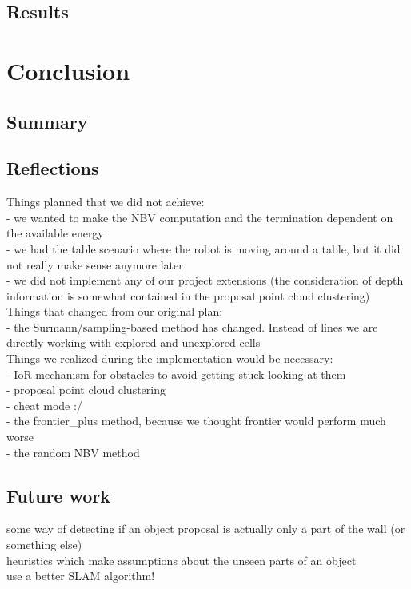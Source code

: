\documentclass[a4paper,11pt,english]{article}
\begin{document}
\subsection{Results}

\section{Conclusion}
\label{Conclusion}

\subsection{Summary}
\subsection{Reflections}

Things planned that we did not achieve:\\
- we wanted to make the NBV computation and the termination dependent on the available energy\\
- we had the table scenario where the robot is moving around a table, but it did not really make sense anymore later\\
- we did not implement any of our project extensions (the consideration of depth information is somewhat contained in the proposal point cloud clustering)\\

Things that changed from our original plan:\\
- the Surmann/sampling-based method has changed. Instead of lines we are directly working with explored and unexplored cells\\

Things we realized during the implementation would be necessary:\\
- IoR mechanism for obstacles to avoid getting stuck looking at them\\
- proposal point cloud clustering\\
- cheat mode :/\\
- the frontier\_plus method, because we thought frontier would perform much worse\\
- the random NBV method

\subsection{Future work}
some way of detecting if an object proposal is actually only a part of the wall (or something else)\\
heuristics which make assumptions about the unseen parts of an object\\
use a better SLAM algorithm!

\newpage


\end{document}
